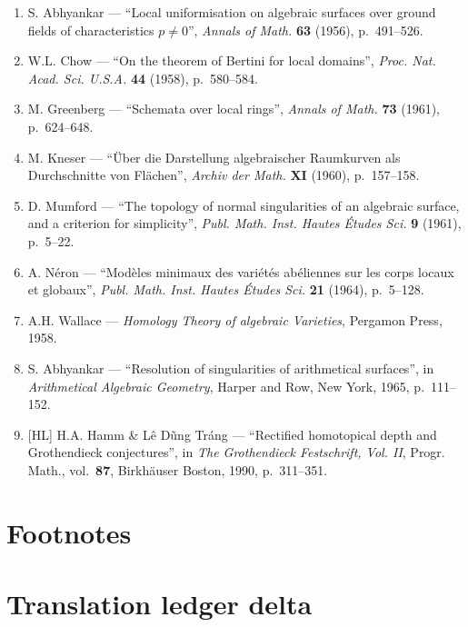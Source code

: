 \documentclass[
  11pt,
  a4paper,
]{book}
\providecommand{\tightlist}{%
  \setlength{\itemsep}{0pt}\setlength{\parskip}{0pt}}
\begin{document}
\begin{enumerate}
\def\labelenumi{\arabic{enumi}.}
\tightlist
\item
  S. Abhyankar --- ``Local uniformisation on algebraic surfaces over
  ground fields of characteristics \(p \neq 0\)'', \emph{Annals of
  Math.} \textbf{63} (1956), p.~491--526.
\item
  W.L. Chow --- ``On the theorem of Bertini for local domains'',
  \emph{Proc. Nat. Acad. Sci. U.S.A.} \textbf{44} (1958), p.~580--584.
\item
  M. Greenberg --- ``Schemata over local rings'', \emph{Annals of Math.}
  \textbf{73} (1961), p.~624--648.
\item
  M. Kneser --- ``Über die Darstellung algebraischer Raumkurven als
  Durchschnitte von Flächen'', \emph{Archiv der Math.} \textbf{XI}
  (1960), p.~157--158.
\item
  D. Mumford --- ``The topology of normal singularities of an algebraic
  surface, and a criterion for simplicity'', \emph{Publ. Math. Inst.
  Hautes Études Sci.} \textbf{9} (1961), p.~5--22.
\item
  A. Néron --- ``Modèles minimaux des variétés abéliennes sur les corps
  locaux et globaux'', \emph{Publ. Math. Inst. Hautes Études Sci.}
  \textbf{21} (1964), p.~5--128.
\item
  A.H. Wallace --- \emph{Homology Theory of algebraic Varieties},
  Pergamon Press, 1958.
\item
  S. Abhyankar --- ``Resolution of singularities of arithmetical
  surfaces'', in \emph{Arithmetical Algebraic Geometry}, Harper and Row,
  New York, 1965, p.~111--152.
\item
  {[}HL{]} H.A. Hamm \& Lê Dũng Tráng --- ``Rectified homotopical depth
  and Grothendieck conjectures'', in \emph{The Grothendieck Festschrift,
  Vol. II}, Progr. Math., vol.~\textbf{87}, Birkhäuser Boston, 1990,
  p.~311--351.
\end{enumerate}

\section{Footnotes}\label{footnotes-1}

\section{Translation ledger delta}\label{translation-ledger-delta-1}
\end{document}
